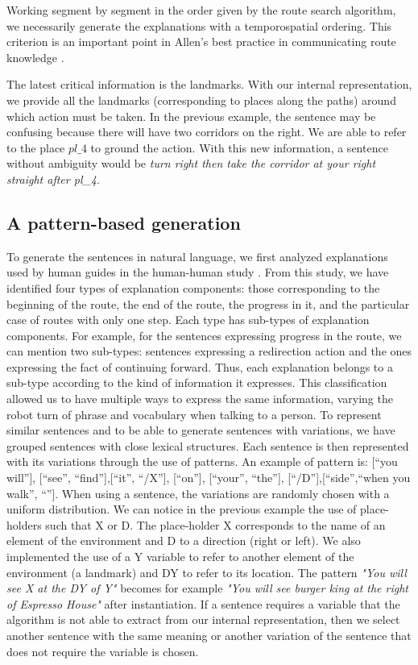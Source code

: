 Working segment by segment in the order given by the route search algorithm, we necessarily generate the explanations with a temporospatial ordering. This criterion is an important point in Allen's best practice in communicating route knowledge \cite{allen_2000_principles}.

The latest critical information is the landmarks. With our internal representation, we provide all the landmarks (corresponding to places along the paths) around which action must be taken. In the previous example, the sentence may be confusing because there will have two corridors on the right. We are able to refer to the place $pl\_4$ to ground the action. With this new information, a sentence without ambiguity would be \textit{turn right then take the corridor at your right straight after pl\_4}.

\subsection{A pattern-based generation}

To generate the sentences in natural language, we first analyzed explanations used by human guides in the human-human study \cite{belhassein_2017_human}. From this study, we have identified four types of explanation components: those corresponding to the beginning of the route, the end of the route, the progress in it, and the particular case of routes with only one step. Each type has sub-types of explanation components. For example, for the sentences expressing progress in the route, we can mention two sub-types: sentences expressing a redirection action and the ones expressing the fact of continuing forward. Thus, each explanation belongs to a sub-type according to the kind of information it expresses. This classification allowed us to have multiple ways to express the same information, varying the robot turn of phrase and vocabulary when talking to a person. To represent similar sentences and to be able to generate sentences with variations, we have grouped sentences with close lexical structures. Each sentence is then represented with its variations through the use of patterns. An example of pattern is: [``you will''], [``see'', ``find''],[``it'', ``/X''], [``on''], [``your'', ``the''], [``/D''],[``side'',``when you walk'', ``'']. When using a sentence, the variations are randomly chosen with a uniform distribution. We can notice in the previous example the use of place-holders such that X or D. The place-holder X corresponds to the name of an element of the environment and D to a direction (right or left). We also implemented the use of a Y variable to refer to another element of the environment (a landmark) and DY to refer to its location. The pattern \textit{"You will see X at the DY of Y"}  becomes for example \textit{"You will see burger king at the right of Espresso House"} after instantiation. If a sentence requires a variable that the algorithm is not able to extract from our internal representation, then we select another sentence with the same meaning or another variation of the sentence that does not require the variable is chosen.

